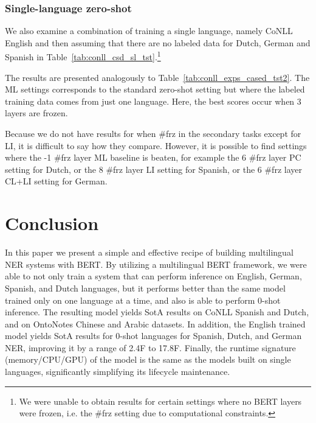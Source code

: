 \documentclass[letterpaper]{article} \usepackage{aaai20}  \usepackage{times}  \usepackage{helvet} \usepackage{courier}  \usepackage[hyphens]{url}  \usepackage{graphicx} \urlstyle{rm} \def\UrlFont{\rm}  \usepackage{graphicx}  \frenchspacing  \setlength{\pdfpagewidth}{8.5in}  \setlength{\pdfpageheight}{11in}  \usepackage{amsmath}
\begin{document}
 \subsubsection{Single-language zero-shot}
We also examine a combination of training a single language, namely CoNLL English and then assuming that there are no labeled data for Dutch, German and Spanish in Table~\ref{tab:conll_csd_sl_tst}.\footnote{We were unable to obtain results for certain settings where no BERT layers were frozen, i.e. the \#frz setting due to computational constraints.}

The results are presented analogously to Table~\ref{tab:conll_exps_cased_tst2}. The ML settings corresponds to the standard zero-shot setting but where the labeled training data comes from just one language. Here, the best scores occur when 3 layers are frozen.

Because we do not have results for when \#frz in the secondary tasks except for LI, it is difficult to say how they compare. However, it is possible to find settings where the -1 \#frz layer ML baseline is beaten, for example the 6 \#frz layer PC setting for Dutch, or the 8 \#frz layer LI setting for Spanish, or the 6 \#frz layer CL+LI setting for German.

















 \section{Conclusion}

In this paper we present a simple and effective recipe of building multilingual NER systems with BERT. By utilizing a multilingual BERT framework, we were able to not only train a system that can perform inference on English, German, Spanish, and Dutch languages, but it performs better than the same model trained only on one language at a time, and also is able to perform 0-shot inference. The resulting model yields SotA results on CoNLL Spanish and Dutch, and on OntoNotes Chinese and Arabic datasets. In addition, the English trained model yields SotA results for 0-shot languages for Spanish, Dutch, and German NER, improving it by a range of 2.4F to 17.8F. Finally, the runtime signature (memory/CPU/GPU) of the model is the same as the models built on single languages, significantly simplifying its lifecycle maintenance.
\end{document}
